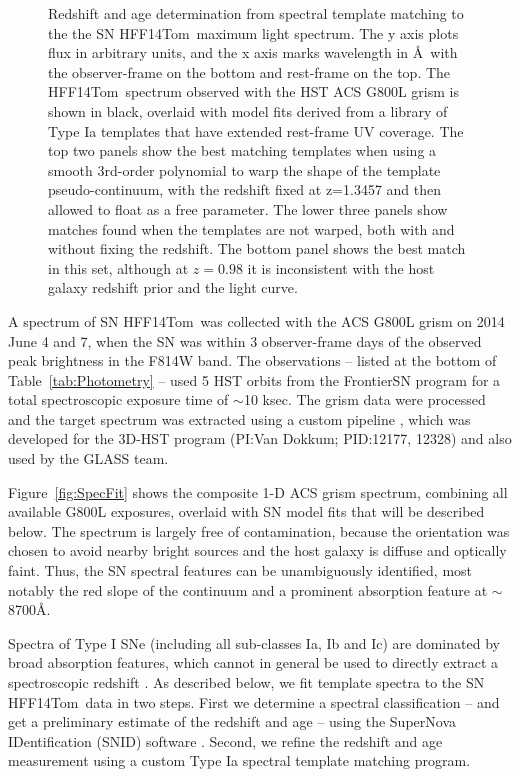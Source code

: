 \documentclass[iop]{emulateapj}
\def\tomas{HFF14Tom}
\begin{document}
\begin{figure}
\begin{center}
{Redshift and age determination from spectral template matching to the
the SN \tomas\ maximum light spectrum.  The y axis plots flux in
arbitrary units, and the x axis marks wavelength in \AA\ with the
observer-frame on the bottom and rest-frame on the top.  The \tomas\
spectrum observed with the HST ACS G800L grism is shown in black,
overlaid with model fits derived from a library of Type Ia templates
that have extended rest-frame UV coverage.  The top two panels show
the best matching templates when using a smooth 3rd-order polynomial
to warp the shape of the template pseudo-continuum, with the redshift
fixed at z=1.3457 and then allowed to float as a free parameter.  The
lower three panels show matches found when the templates are not
warped, both with and without fixing the redshift.  The bottom panel
shows the best match in this set, although at $z=0.98$ it is
inconsistent with the host galaxy redshift prior and the light curve.
}
\end{center}
\end{figure}


A spectrum of SN \tomas\ was collected with the ACS G800L grism on
2014 June 4 and 7, when the SN was within 3 observer-frame
days of the observed peak brightness in the F814W band.  The
observations -- listed at the bottom of Table~\ref{tab:Photometry} --
used 5 HST orbits from the FrontierSN program for a total
spectroscopic exposure time of $\sim$10 ksec.  The grism data were
processed and the target spectrum was extracted using a custom
pipeline \citep{Brammer:2012}, which was developed for the 3D-HST
program (PI:Van Dokkum; PID:12177, 12328) and also used by the GLASS
team.

Figure~\ref{fig:SpecFit} shows the composite 1-D ACS grism spectrum,
combining all available G800L exposures, overlaid with SN model fits
that will be described below.  The spectrum is largely free of
contamination, because the orientation was chosen to avoid nearby
bright sources and the host galaxy is diffuse and optically faint.
Thus, the SN spectral features can be unambiguously identified, most
notably the red slope of the continuum and a prominent absorption
feature at $\sim$8700\AA.  

Spectra of Type I SNe (including all sub-classes Ia, Ib and Ic) are
dominated by broad absorption features, which cannot in general be
used to directly extract a spectroscopic redshift \citep[see
e.g.][]{Filippenko:1997}.  As described below, we fit template spectra
to the SN \tomas\ data in two steps.  First we determine a spectral
classification -- and get a preliminary estimate of the redshift and
age -- using the SuperNova IDentification (SNID)
software \citep{Blondin:2007}.  Second, we refine the redshift and age
measurement using a custom Type Ia spectral template matching program.
\end{document}
